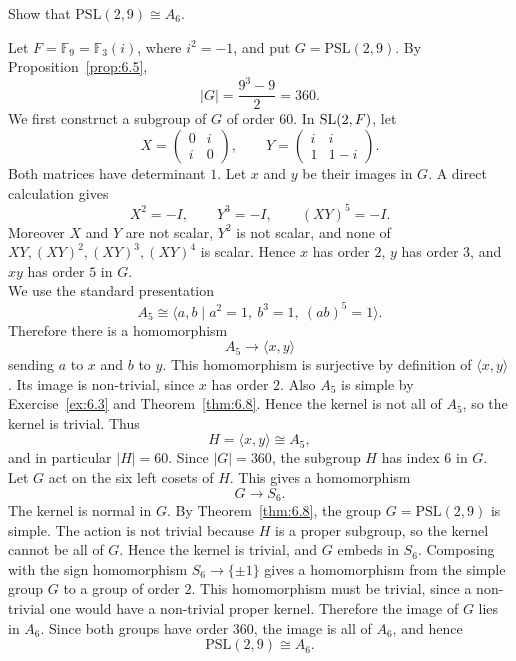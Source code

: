 \documentclass[../Odyssey_Project.tex]{subfiles}
\begin{document}
\begin{exercise}
\label{ex:6.5}
Show that $\mathrm{PSL}(2,9) \cong A_6$.
\end{exercise}
\begin{solution}
Let $F=\mathbb F_9=\mathbb F_3(i)$, where $i^2=-1$, and put $G=\mathrm{PSL}(2,9)$. By Proposition~\ref{prop:6.5},
\[
    |G|=\frac{9^3-9}{2}=360.
\]
We first construct a subgroup of $G$ of order $60$. In $\operatorname{SL}(2,F)$, let
\[
    X=
    \begin{pmatrix}
        0 & i\\
        i & 0
    \end{pmatrix},
    \qquad
    Y=
    \begin{pmatrix}
        i & i\\
        1 & 1-i
    \end{pmatrix}.
\]
Both matrices have determinant $1$. Let $x$ and $y$ be their images in $G$. A direct calculation gives
\[
    X^2=-I,\qquad Y^3=-I,\qquad (XY)^5=-I.
\]
Moreover $X$ and $Y$ are not scalar, $Y^2$ is not scalar, and none of $XY,(XY)^2,(XY)^3,(XY)^4$ is scalar. Hence $x$ has order $2$, $y$ has order $3$, and $xy$ has order $5$ in $G$.\\
We use the standard presentation
\[
    A_5\cong
    \langle a,b\mid a^2=1,\ b^3=1,\ (ab)^5=1\rangle .
\]
Therefore there is a homomorphism
\[
    A_5\to \langle x,y\rangle
\]
sending $a$ to $x$ and $b$ to $y$. This homomorphism is surjective by definition of $\langle x,y\rangle$. Its image is non-trivial, since $x$ has order $2$. Also $A_5$ is simple by Exercise~\ref{ex:6.3} and Theorem~\ref{thm:6.8}. Hence the kernel is not all of $A_5$, so the kernel is trivial. Thus
\[
    H=\langle x,y\rangle\cong A_5,
\]
and in particular $|H|=60$. Since $|G|=360$, the subgroup $H$ has index $6$ in $G$.\\
Let $G$ act on the six left cosets of $H$. This gives a homomorphism
\[
    G\to S_6.
\]
The kernel is normal in $G$. By Theorem~\ref{thm:6.8}, the group $G=\mathrm{PSL}(2,9)$ is simple. The action is not trivial because $H$ is a proper subgroup, so the kernel cannot be all of $G$. Hence the kernel is trivial, and $G$ embeds in $S_6$. Composing with the sign homomorphism $S_6\to\{\pm1\}$ gives a homomorphism from the simple group $G$ to a group of order $2$. This homomorphism must be trivial, since a non-trivial one would have a non-trivial proper kernel. Therefore the image of $G$ lies in $A_6$. Since both groups have order $360$, the image is all of $A_6$, and hence
\[
    \mathrm{PSL}(2,9)\cong A_6.
\]
\end{solution}
\end{document}
